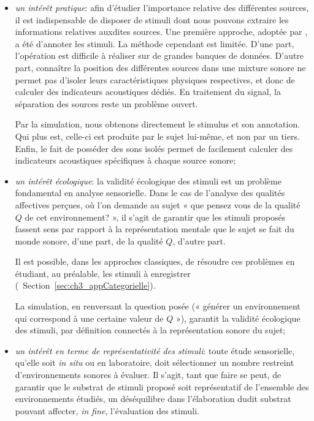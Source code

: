\begin{itemize}
\item \emph{un intérêt pratique}: afin d'étudier l'importance relative des différentes sources, il est indispensable de disposer de stimuli dont nous pouvons extraire les informations relatives auxdites sources. Une première approche, adoptée par \citep{lavandier2006contribution}, a été d'annoter les stimuli. La méthode cependant est limitée. 
D'une part, l'opération est difficile à réaliser sur de grandes banques de données. D'autre part, connaître la position des différentes sources dans une mixture sonore ne permet pas d'isoler leurs caractéristiques physiques respectives, et donc de calculer des indicateurs acoustiques dédiés. En traitement du signal, la séparation des sources reste un problème ouvert\citep{vincent2014blind}.

Par la simulation, nous obtenons directement le stimulus et son annotation. Qui plus est, celle-ci est produite par le sujet lui-même, et non par un tiers. Enfin, le fait de posséder des sons isolés permet de facilement calculer des indicateurs acoustiques spécifiques à chaque source sonore;

\item \emph{un intérêt écologique}: la validité écologique des stimuli est un problème fondamental en analyse sensorielle. Dans le cas de l'analyse des qualités affectives perçues, où l'on demande au sujet « que pensez vous de la qualité $Q$ de cet environnement? », il s'agit de garantir que les stimuli proposés fassent sens par rapport à la représentation mentale que le sujet se fait du monde sonore, d'une part, de la qualité $Q$, d'autre part.

Il est possible, dans les approches classiques, de résoudre ces problèmes en étudiant, au préalable, les stimuli à enregistrer (\cf~Section~\ref{sec:ch3_appCategorielle}). 

La simulation, en renversant la question posée (« générer un environnement qui correspond à une certaine valeur de $Q$ »), garantit la validité écologique des stimuli, par définition connectés à la représentation sonore du sujet;

\item \emph{un intérêt en terme de représentativité des stimuli}: toute étude sensorielle, qu'elle soit \emph{in situ} ou en laboratoire, doit sélectionner un nombre restreint d'environnements sonores à évaluer. Il s'agit, tant que faire se peut, de garantir que le substrat de stimuli proposé soit représentatif de l'ensemble des environnements étudiés, un déséquilibre dans l'élaboration dudit substrat pouvant affecter, \emph{in fine}, l'évaluation des stimuli. 


\end{itemize}
